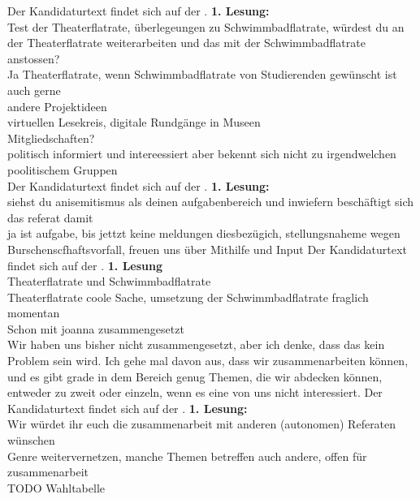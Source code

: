     {
        Der Kandidaturtext findet sich auf der \kandidaturenseite.
    }{
        \textbf{1. Lesung:}\\
        Test der Theaterflatrate, überlegeungen zu Schwimmbadflatrate, würdest du an der Theaterflatrate weiterarbeiten und das mit der Schwimmbadflatrate anstossen?\\
            Ja Theaterflatrate, wenn Schwimmbadflatrate von Studierenden gewünscht ist auch gerne\\
        andere Projektideen\\
            virtuellen Lesekreis, digitale Rundgänge in Museen\\
        Mitgliedschaften?\\
            politisch informiert und intereessiert aber bekennt sich nicht zu irgendwelchen poolitischem Gruppen\\
    }
    {
        Der Kandidaturtext findet sich auf der \kandidaturenseite.
    }{
        \textbf{1. Lesung:}\\
        siehst du anisemitismus als deinen aufgabenbereich und inwiefern beschäftigt sich das referat damit\\
            ja ist aufgabe, bis jettzt keine meldungen diesbezügich, stellungsnaheme wegen Burschenscfhaftsvorfall, freuen uns über Mithilfe und Input
    }
{
    Der Kandidaturtext findet sich auf der \kandidaturenseite.
}{
    \textbf{1. Lesung}\\
    Theaterflatrate und Schwimmbadflatrate\\
        Theaterflatrate coole Sache, umsetzung der Schwimmbadflatrate fraglich momentan\\
    Schon mit joanna zusammengesetzt\\
    Wir haben uns bisher nicht zusammengesetzt, aber ich denke, dass das kein Problem sein wird. Ich gehe mal davon aus, dass wir zusammenarbeiten können, und es gibt grade in dem Bereich genug Themen, die wir abdecken können, entweder zu zweit oder einzeln, wenn es eine von uns nicht interessiert.
}
{
    Der Kandidaturtext findet sich auf der \kandidaturenseite.
}
{
    \textbf{1. Lesung:}\\
    Wir würdet ihr euch die zusammenarbeit mit anderen (autonomen) Referaten wünschen\\
        Genre weitervernetzen, manche Themen betreffen auch andere, offen für zusammenarbeit\\
}
TODO Wahltabelle